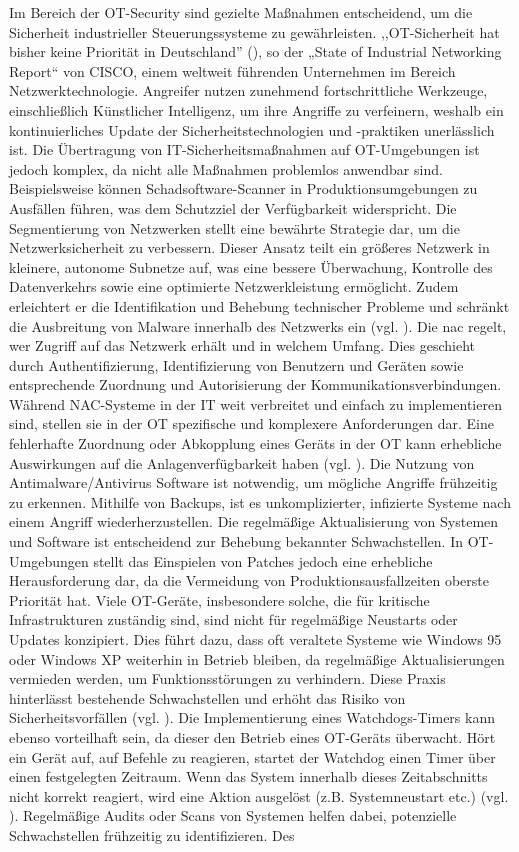 Im Bereich der OT-Security sind gezielte Maßnahmen entscheidend, um die Sicherheit industrieller Steuerungssysteme zu gewährleisten. ,,OT-Sicherheit hat bisher keine Priorität in Deutschland'' (\cite{CISCO}), so der „State of Industrial Networking Report“ von CISCO, einem weltweit führenden Unternehmen im Bereich Netzwerktechnologie. Angreifer nutzen zunehmend fortschrittliche Werkzeuge, einschließlich Künstlicher Intelligenz, um ihre Angriffe zu verfeinern, weshalb ein kontinuierliches Update der Sicherheitstechnologien und -praktiken unerlässlich ist. Die Übertragung von IT-Sicherheitsmaßnahmen auf OT-Umgebungen ist jedoch komplex, da nicht alle Maßnahmen problemlos anwendbar sind. Beispielsweise können Schadsoftware-Scanner in Produktionsumgebungen zu Ausfällen führen, was dem Schutzziel der Verfügbarkeit widerspricht. Die Segmentierung von Netzwerken stellt eine bewährte Strategie dar, um die Netzwerksicherheit zu verbessern. Dieser Ansatz teilt ein größeres Netzwerk in kleinere, autonome Subnetze auf, was eine bessere Überwachung, Kontrolle des Datenverkehrs sowie eine optimierte Netzwerkleistung ermöglicht. Zudem erleichtert er die Identifikation und Behebung technischer Probleme und schränkt die Ausbreitung von Malware innerhalb des Netzwerks ein (vgl. \cite{Netzwerksegmentierung}). Die \ac{nac} regelt, wer Zugriff auf das Netzwerk erhält und in welchem Umfang. Dies geschieht durch Authentifizierung, Identifizierung von Benutzern und Geräten sowie entsprechende Zuordnung und Autorisierung der Kommunikationsverbindungen. Während NAC-Systeme in der IT weit verbreitet und einfach zu implementieren sind, stellen sie in der OT spezifische und komplexere Anforderungen dar. Eine fehlerhafte Zuordnung oder Abkopplung eines Geräts in der OT kann erhebliche Auswirkungen auf die Anlagenverfügbarkeit haben (vgl. \cite{NAC}). Die Nutzung von Antimalware/Antivirus Software ist notwendig, um mögliche Angriffe frühzeitig zu erkennen. Mithilfe von Backups, ist es unkomplizierter, infizierte Systeme nach einem Angriff wiederherzustellen. Die regelmäßige Aktualisierung von Systemen und Software ist entscheidend zur Behebung bekannter Schwachstellen. In OT-Umgebungen stellt das Einspielen von Patches jedoch eine erhebliche Herausforderung dar, da die Vermeidung von Produktionsausfallzeiten oberste Priorität hat. Viele OT-Geräte, insbesondere solche, die für kritische Infrastrukturen zuständig sind, sind nicht für regelmäßige Neustarts oder Updates konzipiert. Dies führt dazu, dass oft veraltete Systeme wie Windows 95 oder Windows XP weiterhin in Betrieb bleiben, da regelmäßige Aktualisierungen vermieden werden, um Funktionsstörungen zu verhindern. Diese Praxis hinterlässt bestehende Schwachstellen und erhöht das Risiko von Sicherheitsvorfällen (vgl. \cite{conscia}). \clearpage \noindent Die Implementierung eines Watchdogs-Timers kann ebenso vorteilhaft sein, da dieser den Betrieb eines OT-Geräts überwacht. Hört ein Gerät auf, auf Befehle zu reagieren, startet der Watchdog einen Timer über einen festgelegten Zeitraum. Wenn das System innerhalb dieses Zeitabschnitts nicht korrekt reagiert, wird eine Aktion ausgelöst (z.B. Systemneustart etc.) (vgl. \cite{watchdog}). Regelmäßige Audits oder Scans von Systemen helfen dabei, potenzielle Schwachstellen frühzeitig zu identifizieren. Des 